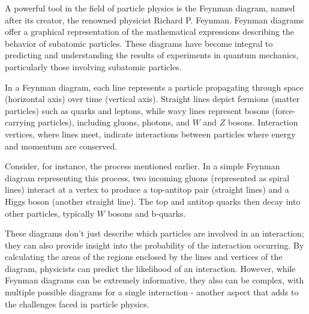 A powerful tool in the field of particle physics is the Feynman diagram, named after its creator, the renowned physicist
Richard P. Feynman. Feynman diagrams offer a graphical representation of the mathematical expressions describing the
behavior of subatomic particles. These diagrams have become integral to predicting and understanding the results of
experiments in quantum mechanics, particularly those involving subatomic particles.

In a Feynman diagram, each line represents a particle propagating through space (horizontal axis) over time (vertical
axis). Straight lines depict fermions (matter particles) such as quarks and leptons, while wavy lines represent bosons
(force-carrying particles), including gluons, photons, and $W$ and $Z$ bosons. Interaction vertices, where lines meet,
indicate interactions between particles where energy and momentum are conserved.

Consider, for instance, the \tth process mentioned earlier. In a simple Feynman diagram representing this process, two
incoming gluons (represented as spiral lines) interact at a vertex to produce a top-antitop pair (straight lines) and a
Higgs boson (another straight line). The top and antitop quarks then decay into other particles, typically $W$ bosons and
b-quarks.

These diagrams don't just describe which particles are involved in an interaction; they can also provide insight into
the probability of the interaction occurring. By calculating the areas of the regions enclosed by the lines and vertices
of the diagram, physicists can predict the likelihood of an interaction. However, while Feynman diagrams can be
extremely informative, they also can be complex, with multiple possible diagrams for a single interaction - another
aspect that adds to the challenges faced in particle physics.